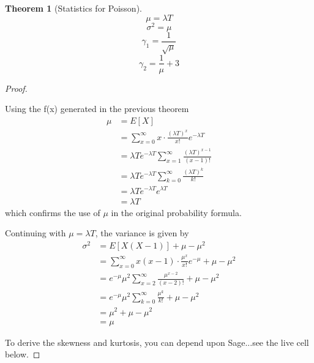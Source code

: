 \documentclass[10pt,]{book}
\theoremstyle{plain}
\newtheorem{theorem}{Theorem}[section]
\theoremstyle{definition}
\theoremstyle{definition}
\theoremstyle{definition}
\numberwithin{equation}{section}
\begin{document}
\begin{theorem}[{Statistics for Poisson}]\label{theorem-48}
\begin{equation*}\mu = \lambda T\end{equation*}\begin{equation*}\sigma^2 = \mu\end{equation*}\begin{equation*}\gamma_1 = \frac{1}{\sqrt{\mu}}\end{equation*}\begin{equation*}\gamma_2 = \frac{1}{\mu}+3\end{equation*}\end{theorem}
\begin{proof}\hypertarget{proof-47}{}
 Using the f(x) generated in the previous theorem
\begin{align*}
\mu & = E[X] \\
 & = \sum_{x=0}^{\infty} x \cdot \frac{(\lambda T)^x}{x!} e^{-\lambda T}\\
 & = \lambda T e^{-\lambda T} \sum_{x=1}^{\infty} \frac{(\lambda T)^{x-1}}{(x-1)!} \\
 & = \lambda T e^{-\lambda T} \sum_{k=0}^{\infty} \frac{(\lambda T)^k}{k!} \\
 & = \lambda T e^{-\lambda T} e^{\lambda T} \\
 & = \lambda T 
\end{align*}
which confirms the use of \(\mu\) in the original probability formula.
%
\par

Continuing with \(\mu = \lambda T\), the variance is given by
\begin{align*}
\sigma^2 & = E[X(X-1)] + \mu - \mu^2 \\
 & = \sum_{x=0}^{\infty} x(x-1) \cdot \frac{\mu^x}{x!} e^{-\mu} + \mu - \mu^2\\
 & = e^{-\mu} \mu^2 \sum_{x=2}^{\infty} \frac{\mu^{x-2}}{(x-2)!} + \mu - \mu^2\\
 & = e^{-\mu} \mu^2 \sum_{k=0}^{\infty} \frac{\mu^k}{k!} + \mu - \mu^2\\
 & = \mu^2 + \mu - \mu^2 \\
 & = \mu
\end{align*}

To derive the skewness and kurtosis, you can depend upon Sage...see the live cell below.
%
\end{proof}
\end{document}
